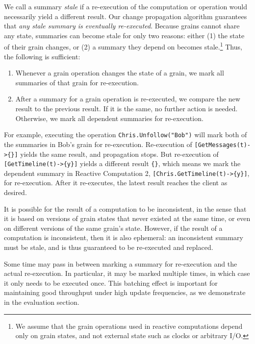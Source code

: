 We call a summary \emph{stale} if a re-execution of the computation or operation would necessarily yield a different result. Our change propagation algorithm guarantees that \emph{any stale summary is eventually re-executed}. Because grains cannot share any state, summaries can become stale for only two reasons: either (1) the state of their grain changes, or (2) a summary they depend on becomes stale.\footnote{We assume that the grain operations used in reactive computations depend only on grain states, and not external state such as clocks or arbitrary I/O.} Thus, the following is sufficient:
\begin{enumerate}
\item Whenever a grain operation changes the state of a grain, we mark all summaries of that grain for re-execution.
\item After a summary for a grain operation is re-executed, we compare the new result to the previous result. If it is the same, no further action is needed. Otherwise, we mark all dependent summaries for re-execution.
\end{enumerate}
 
\noindent For example, executing the operation \lstinline|Chris.Unfollow("Bob")| will mark both of the summaries in Bob's grain for re-execution. Re-execution of \lstinline|[GetMessages(t)->{}]| yields the same result, and propagation stops. But re-execution of \lstinline|[GetTimeline(t)->{y}]| yields a different result \lstinline|{}|, which means we mark the dependent summary in Reactive Computation 2, \lstinline|[Chris.GetTimeline(t)->{y}]|, for re-execution. After it re-executes, the latest result reaches the client as desired.

It is possible for the result of a computation to be inconsistent, in the sense that it is based on versions of grain states that never existed at the same time, or even on different versions of the same grain's state. However, if the result of a computation is inconsistent, then it is also ephemeral: an inconsistent summary must be stale, and is thus guaranteed to be re-executed and replaced.

 Some time may pass in between marking a summary for re-execution and the actual re-execution. In particular, it may be marked multiple times, in which case it only needs to be executed once. This batching effect is important for maintaining good throughput under high update frequencies, as we demonstrate in the evaluation section.

